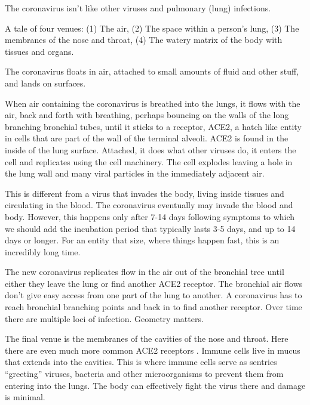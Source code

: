 \documentclass[onecolumn,journal]{IEEEtran}
\begin{document}
\begin{multicols}{2}


The coronavirus isn't like other viruses and pulmonary (lung) infections.

A tale of four venues: (1) The air, (2) The space within a person's lung, (3) The membranes of the nose and throat, (4) The watery matrix of the body with tissues and organs. 

The coronavirus floats in air, attached to small amounts of fluid and other stuff, and lands on surfaces.

When air containing the coronavirus is breathed into the lungs, it flows with the air, back and forth with breathing, perhaps bouncing on the walls of the long branching bronchial tubes, until it sticks to a receptor, ACE2, a hatch like entity in cells that are part of the wall of the terminal alveoli. ACE2 is found in the inside of the lung surface. Attached, it does what other viruses do, it enters the cell and replicates using the cell machinery. The cell explodes leaving a hole in the lung wall and many viral particles in the immediately adjacent air.

This is different from a virus that invades the body, living inside tissues and circulating in the blood. The coronavirus eventually may invade the blood and body. However, this happens only after 7-14 days following symptoms \cite{blood} to which we should add the incubation period that typically lasts 3-5 days, and up to 14 days or longer. For an entity that size, where things happen fast, this is an incredibly long time.

The new coronavirus replicates flow in the air out of the bronchial tree until either they leave the lung or find another ACE2 receptor. The bronchial air flows don't give easy access from one part of the lung to another. A coronavirus has to reach bronchial branching points and back in to find another receptor. Over time there are multiple loci of infection. Geometry matters. 

The final venue is the membranes of the cavities of the nose and throat. Here there are even much more common ACE2 receptors \cite{huang}. Immune cells live in mucus that extends into the cavities. This is where immune cells serve as sentries ``greeting'' viruses, bacteria and other microorganisms to prevent them from entering into the lungs. The body can effectively fight the virus there and damage is minimal.


\end{multicols}
\end{document}
